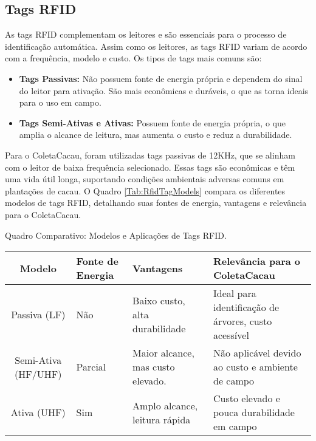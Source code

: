 \subsection{Tags RFID}
As tags RFID complementam os leitores e são essenciais para o processo de identificação automática. Assim como os leitores, as tags RFID variam de acordo com a frequência, modelo e custo. Os tipos de tags mais comuns são:

\begin{itemize}
    \item \textbf{Tags Passivas:} Não possuem fonte de energia própria e dependem do sinal do leitor para ativação. São mais econômicas e duráveis, o que as torna ideais para o uso em campo.
    
    \item \textbf{Tags Semi-Ativas e Ativas:} Possuem fonte de energia própria, o que amplia o alcance de leitura, mas aumenta o custo e reduz a durabilidade.
\end{itemize}

Para o ColetaCacau, foram utilizadas tags passivas de 12KHz, que se alinham com o leitor de baixa frequência selecionado. Essas tags são econômicas e têm uma vida útil longa, suportando condições ambientais adversas comuns em plantações de cacau. O Quadro \ref{Tab:RfidTagModels} compara os diferentes modelos de tags RFID, detalhando suas fontes de energia, vantagens e relevância para o ColetaCacau.

\begin{quadro}[!htb]
    \centering
    \footnotesize
    \caption{Quadro Comparativo: Modelos e Aplicações de Tags RFID.}
	\begin{tabular}{|c|p{3cm}|p{3cm}|p{5cm}|}
	   \hline
	   \textbf{Modelo} & \centering\textbf{Fonte de Energia} & \textbf{Vantagens} & \textbf{Relevância para o ColetaCacau}\\
	   \hline
            Passiva (LF)  & Não & Baixo custo, alta durabilidade & Ideal para identificação de árvores, custo acessível \\ 
        \hline
            Semi-Ativa (HF/UHF)        & Parcial     & Maior alcance, mas custo elevado. & Não aplicável devido ao custo e ambiente de campo \\ 
        \hline
            Ativa (UHF)          & Sim               & Amplo alcance, leitura rápida          & Custo elevado e pouca durabilidade em campo \\ 
        \hline
	\end{tabular}
    \label{Tab:RfidTagModels}
\end{quadro}

